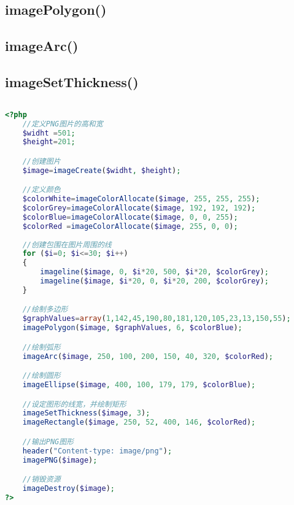 \subsection{imagePolygon()}



\subsection{imageArc()}




\subsection{imageSetThickness()}



\begin{lstlisting}[language=PHP]

\end{lstlisting}




\begin{lstlisting}[language=PHP]
<?php
	//定义PNG图片的高和宽
	$widht =501;
	$height=201;

	//创建图片
	$image=imageCreate($widht, $height);

	//定义颜色
	$colorWhite=imageColorAllocate($image, 255, 255, 255);
	$colorGrey=imageColorAllocate($image, 192, 192, 192);
	$colorBlue=imageColorAllocate($image, 0, 0, 255);
	$colorRed =imageColorAllocate($image, 255, 0, 0);
	
	//创建包围在图片周围的线
	for ($i=0; $i<=30; $i++)
	{
		imageline($image, 0, $i*20, 500, $i*20, $colorGrey);
		imageline($image, $i*20, 0, $i*20, 200, $colorGrey);
	}

	//绘制多边形
	$graphValues=array(1,142,45,190,80,181,120,105,23,13,150,55);
	imagePolygon($image, $graphValues, 6, $colorBlue);

	//绘制弧形
	imageArc($image, 250, 100, 200, 150, 40, 320, $colorRed);

	//绘制圆形
	imageEllipse($image, 400, 100, 179, 179, $colorBlue);

	//设定图形的线宽，并绘制矩形
	imageSetThickness($image, 3);
	imageRectangle($image, 250, 52, 400, 146, $colorRed);

	//输出PNG图形
	header("Content-type: image/png");
	imagePNG($image);

	//销毁资源
	imageDestroy($image);
?>
\end{lstlisting}





